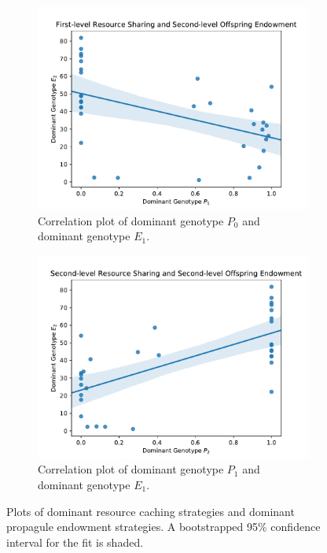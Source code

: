\begin{figure}[!htbp]
\begin{center}

\begin{subfigure}[b]{0.5\columnwidth}
  \includegraphics[width=\columnwidth]{img/champion_res_pool1_vs_champion_endowment2}
  \caption{
  Correlation plot of dominant genotype $P_0$ and dominant genotype $E_1$.
  }
  \label{fig:champion_res_pool1_vs_champion_endowment2}
\end{subfigure}%
\begin{subfigure}[b]{0.5\columnwidth}
  \includegraphics[width=\columnwidth]{img/champion_res_pool2_vs_champion_endowment2}
  \caption{
  Correlation plot of dominant genotype $P_1$ and dominant genotype $E_1$.
  }
  \label{fig:champion_res_pool2_vs_champion_endowment2}
\end{subfigure}

\caption{
Plots of dominant resource caching strategies and dominant propagule endowment strategies.
A bootstrapped 95\% confidence interval for the fit is shaded.
}
\label{fig:endowment}
\end{center}
\end{figure}
